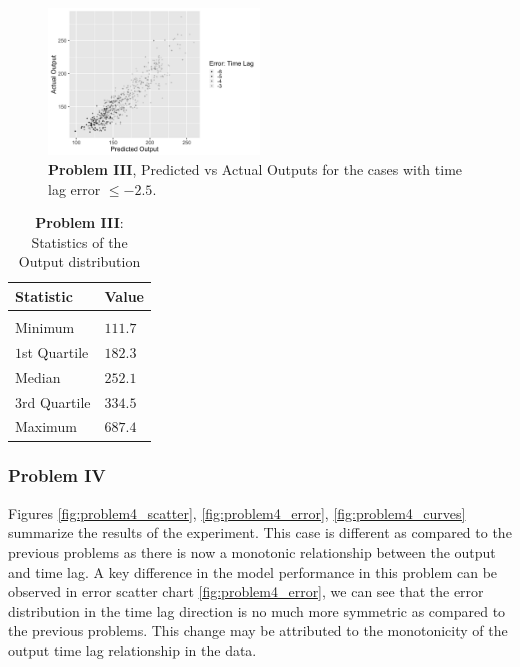 \documentclass[twoside]{article}
\begin{document}
\begin{figure}[h]
\vspace{.3in}
\centerline{\includegraphics[width=0.5\textwidth]{figures/exp3_lag_error_jus.png}}
\vspace{.3in}
\caption{\textbf{Problem III}, Predicted vs Actual Outputs for the cases with time lag error $\leq -2.5$.}
\label{fig:problem3_lag_error_jus}
\end{figure}


\begin{table}[h]
\caption{\textbf{Problem III}: Statistics of the Output distribution} \label{table:problem3_stats}
\begin{center}
\begin{tabular}{ll}
\textbf{Statistic}  &\textbf{Value} \\
\hline \\
Minimum         & $111.7$ \\
$1$st Quartile  & $182.3$ \\
Median          & $252.1$ \\
$3$rd Quartile  & $334.5$ \\
Maximum         & $687.4$ \\
\end{tabular}
\end{center}
\end{table}


\subsubsection{Problem IV}

Figures \ref{fig:problem4_scatter}, \ref{fig:problem4_error}, \ref{fig:problem4_curves} summarize the results of the experiment. This case is different as compared to the previous problems as there is now
a monotonic relationship between the output and time lag. A key difference in the model performance in this problem can be observed in error scatter chart \ref{fig:problem4_error}, we can see that the error distribution in the time lag direction is no much more symmetric as compared to the previous problems. This change may be attributed to the monotonicity of the output time lag relationship in the data.
\end{document}

